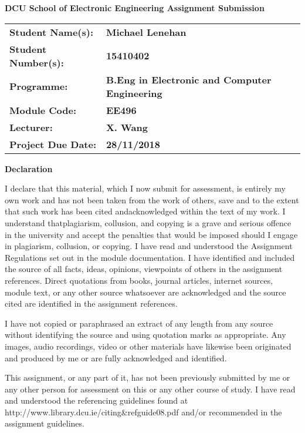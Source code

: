 \documentclass[12pt,a4paper]{scrartcl}
\begin{document}
\begin{titlepage}
  \begin{center}
    \vspace{1cm}
    {\Large\textbf{DCU School of Electronic Engineering Assignment Submission}}

    \vspace{0.5cm}
    \begin{tabu}{ X[l] X[2l] }
      \textbf{Student Name(s):} & \textbf{Michael Lenehan} \\
      \textbf{Student Number(s):} & \textbf{15410402} \\
      \textbf{Programme:} & \textbf{B.Eng in Electronic and Computer Engineering} \\
      \textbf{Module Code:} & \textbf{EE496} \\
      \textbf{Lecturer:} & \textbf{X. Wang} \\    
      \textbf{Project Due Date:} & \textbf{28/11/2018}
    \end{tabu}

    \vspace{0.5cm}
    \textbf{Declaration}
 \end{center}
    \begin{bfseries}
    I declare that this material, which I now submit for assessment, is entirely
    my own work and has not been taken from the work of others, save and to the
    extent that such work has been cited andacknowledged within the text of my
    work. I understand thatplagiarism, collusion, and copying is a grave and
    serious offence in the university and accept the penalties that would be
    imposed should I engage in plagiarism, collusion, or copying. I have read
    and understood the Assignment Regulations set out in the module documentation.
    I have identified and included the source of all facts, ideas, opinions,
    viewpoints of others in the assignment references. Direct quotations from
    books, journal articles, internet sources, module text, or any other source
    whatsoever are acknowledged and the source cited are identified in the
    assignment references. 
    
    I have not copied or paraphrased an extract of any
    length from any source without identifying the source and using quotation
    marks as appropriate. Any images, audio recordings, video or other materials
    have likewise been originated and produced by me or are fully acknowledged
    and identified.
    
    This assignment, or any part of it, has not been previously
    submitted by me or any other person for assessment on this or any other 
    course of study. I have read and understood the referencing guidelines found
    at http://www.library.dcu.ie/citing\&refguide08.pdf and/or recommended in the
    assignment guidelines. 
    

\end{bfseries}
\end{titlepage}
\end{document}
